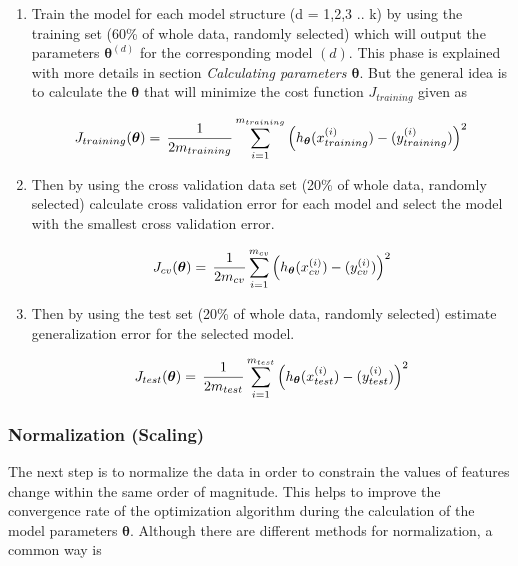 \begin{enumerate}
  \item Train the model for each model structure (d = 1,2,3 .. k) by using the training set (60\% of whole data, randomly selected) which will output the parameters ${\bm{\theta}}^{(d)}$ for the corresponding model $(d)$.
  This phase is explained with more details in section \emph{Calculating parameters ${\bm{\theta}}$}. But the general idea is to calculate the ${\bm{\theta}}$ that will minimize the cost function $J_{training}$ given as

\begin{equation}{\label{eqn:costFuncTraining}}
J_{training}({\bm{\theta}})
=\,
\frac{1}{2m_{training}} \sum\limits_{i=1}^{m_{training}} \Big(h_{\bm{\theta}}(x_{training}^{(i)}) - (y_{training}^{(i)})\Big)^2  
\end{equation}   
  
  \item Then by using the cross validation data set (20\% of whole data, randomly selected) calculate cross validation error for each model and select the model with the smallest cross validation error.

\begin{equation}{\label{eqn:costFuncCrossVal}}
J_{cv}({\bm{\theta}})
=\,
\frac{1}{2m_{cv}} \sum\limits_{i=1}^{m_{cv}} \Big(h_{\bm{\theta}}(x_{cv}^{(i)}) - (y_{cv}^{(i)})\Big)^2  
\end{equation} 

  \item Then by using the test set (20\% of whole data, randomly selected) estimate generalization error for the selected model.
  
\begin{equation}{\label{eqn:costFuncTest}}
J_{test}({\bm{\theta}})
=\,
\frac{1}{2m_{test}} \sum\limits_{i=1}^{m_{test}} \Big(h_{\bm{\theta}}(x_{test}^{(i)}) - (y_{test}^{(i)})\Big)^2  
\end{equation} 

\end{enumerate}

\subsubsection{Normalization (Scaling)}

The next step is to normalize the data in order to constrain the values of features change within the same order of magnitude. 
This helps to improve the convergence rate of the optimization algorithm during the calculation of the model parameters $\bm{\theta}$.  
Although there are different methods for normalization, a common way is


